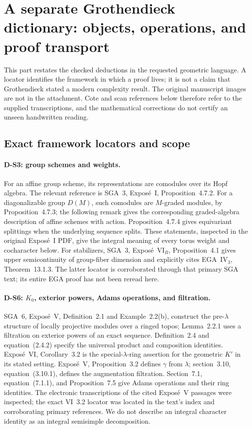 \section{A separate Grothendieck dictionary: objects, operations, and proof transport}
\label{sec:grothendieck-dictionary}

This part restates the checked deductions in the requested geometric language. A locator identifies the framework in which a proof lives; it is not a claim that Grothendieck stated a modern complexity result. The original manuscript images are not in the attachment. Cote and scan references below therefore refer to the supplied transcriptions, and the mathematical corrections do not certify an unseen handwritten reading.

\subsection{Exact framework locators and scope}

\paragraph{D-S3: group schemes and weights.}
For an affine group scheme, its representations are comodules over its Hopf algebra. The relevant reference is SGA~3, Expos\'e~I, Proposition~4.7.2. For a diagonalizable group $D(M)$, such comodules are $M$-graded modules, by Proposition~4.7.3; the following remark gives the corresponding graded-algebra description of affine schemes with action. Proposition~4.7.4 gives equivariant splittings when the underlying sequence splits. These statements, inspected in the original Expos\'e~I PDF, give the integral meaning of every torus weight and cocharacter below. For stabilizers, SGA~3, Expos\'e~VI$_B$, Proposition~4.1 gives upper semicontinuity of group-fiber dimension and explicitly cites EGA~IV$_3$, Theorem~13.1.3. The latter locator is corroborated through that primary SGA text; its entire EGA proof has not been reread here.

\paragraph{D-S6: $K_0$, exterior powers, Adams operations, and filtration.}
SGA~6, Expos\'e~V, Definition~2.1 and Example~2.2(b), construct the pre-$\lambda$ structure of locally projective modules over a ringed topos; Lemma~2.2.1 uses a filtration on exterior powers of an exact sequence. Definition~2.4 and equation~(2.4.2) specify the universal product and composition identities. Expos\'e~VI, Corollary~3.2 is the special-$\lambda$-ring assertion for the geometric $K'$ in its stated setting. Expos\'e~V, Proposition~3.2 defines $\gamma$ from $\lambda$; section~3.10, equation~(3.10.1), defines the augmentation filtration. Section~7.1, equation~(7.1.1), and Proposition~7.5 give Adams operations and their ring identities. The electronic transcriptions of the cited Expos\'e~V passages were inspected; the exact VI~3.2 locator was located in the text's index and corroborating primary references. We do not describe an integral character identity as an integral semisimple decomposition.

